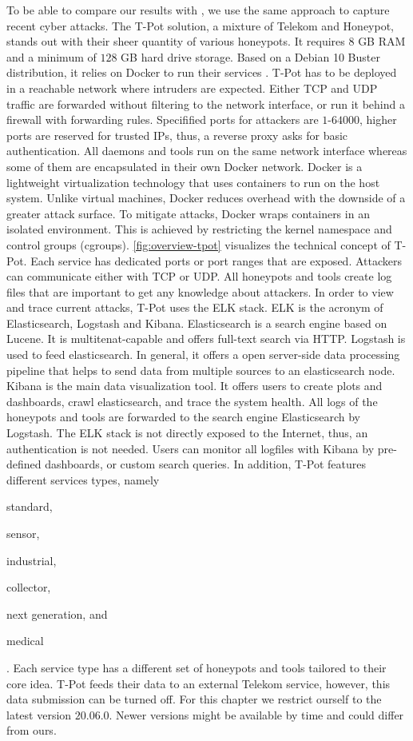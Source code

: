 To be able to compare our results with \citet{Kelly2021}, we use the same approach to capture recent cyber attacks.
The T-Pot solution, a mixture of Telekom and Honeypot, stands out with their sheer quantity of various honeypots.
It requires $8$ GB RAM and a minimum of $128$ GB hard drive storage.
Based on a Debian 10 Buster distribution, it relies on Docker to run their services \cite{combe2016}.
T-Pot has to be deployed in a reachable network where intruders are expected.
Either TCP and UDP traffic are forwarded without filtering to the network interface, or run it behind a firewall with forwarding rules.
Specifified ports for attackers are $1$-$64000$, higher ports are reserved for trusted IPs, thus, a reverse proxy asks for basic authentication.
All daemons and tools run on the same network interface whereas some of them are encapsulated in their own Docker network.
Docker is a lightweight virtualization technology that uses containers to run on the host system.
Unlike virtual machines, Docker reduces overhead with the downside of a greater attack surface.
To mitigate attacks, Docker wraps containers in an isolated environment.
This is achieved by restricting the kernel namespace and control groups (cgroups).
\autoref{fig:overview-tpot} visualizes the technical concept of T-Pot.
Each service has dedicated ports or port ranges that are exposed.
Attackers can communicate either with TCP or UDP.
All honeypots and tools create log files that are important to get any knowledge about attackers.
In order to view and trace current attacks, T-Pot uses the ELK stack.
ELK is the acronym of Elasticsearch, Logstash and Kibana.
Elasticsearch is a search engine based on Lucene.
It is multitenat-capable and offers full-text search via HTTP.
Logstash is used to feed elasticsearch.
In general, it offers a open server-side data processing pipeline that helps to send data from multiple sources to an elasticsearch node.
Kibana is the main data visualization tool.
It offers users to create plots and dashboards, crawl elasticsearch, and trace the system health.
All logs of the honeypots and tools are forwarded to the search engine Elasticsearch by Logstash.
The ELK stack is not directly exposed to the Internet, thus, an authentication is not needed.
Users can monitor all logfiles with Kibana by pre-defined dashboards, or custom search queries.
In addition, T-Pot features different services types, namely
\begin{enumerate*}[label=(\roman*)]
    \item standard,
    \item sensor,
    \item industrial,
    \item collector,
    \item next generation, and
    \item medical
\end{enumerate*}.
Each service type has a different set of honeypots and tools tailored to their core idea.
T-Pot feeds their data to an external Telekom service, however, this data submission can be turned off.
For this chapter we restrict ourself to the latest version $20.06.0$.
Newer versions might be available by time and could differ from ours.

